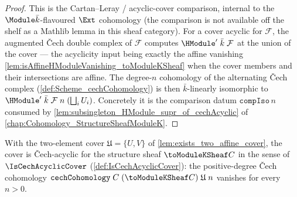 \begin{proof}
  This is the Cartan--Leray / acyclic-cover comparison, internal to the
  \(\Module \bar k\)-flavoured \(\Ext\) cohomology (the comparison is not
  available off the shelf as a Mathlib lemma in this sheaf category). For
  a cover acyclic for \(\mathcal F\), the augmented Čech double complex of
  \(\mathcal F\) computes \(\HModule'\;\bar k\;\mathcal F\) at the union
  of the cover --- the acyclicity input being exactly the affine vanishing
  \cref{lem:isAffineHModuleVanishing_toModuleKSheaf} when the cover
  members and their intersections are affine. The degree-\(n\) cohomology
  of the alternating Čech complex (\cref{def:Scheme_cechCohomology}) is
  then \(\bar k\)-linearly isomorphic to
  \(\HModule'\;\bar k\;\mathcal F\;n\;(\bigsqcup_i U_i)\). Concretely it
  is the comparison datum \(\mathtt{compIso}\,n\) consumed by
  \cref{lem:subsingleton_HModule_supr_of_cechAcyclic} of
  \cref{chap:Cohomology_StructureSheafModuleK}.
\end{proof}

\begin{lemma}
  \label{lem:isCechAcyclicCover_twoAffine}
  With the two-element cover \(\mathfrak U = \{U, V\}\) of
  \cref{lem:exists_two_affine_cover}, the cover is Čech-acyclic for the
  structure sheaf \(\toModuleKSheaf C\) in the sense of
  \(\IsCechAcyclicCover\) (\cref{def:IsCechAcyclicCover}): the
  positive-degree Čech cohomology
  \(\mathtt{cechCohomology}\;C\;(\toModuleKSheaf C)\;\mathfrak U\;n\)
  vanishes for every \(n > 0\).
\end{lemma}

